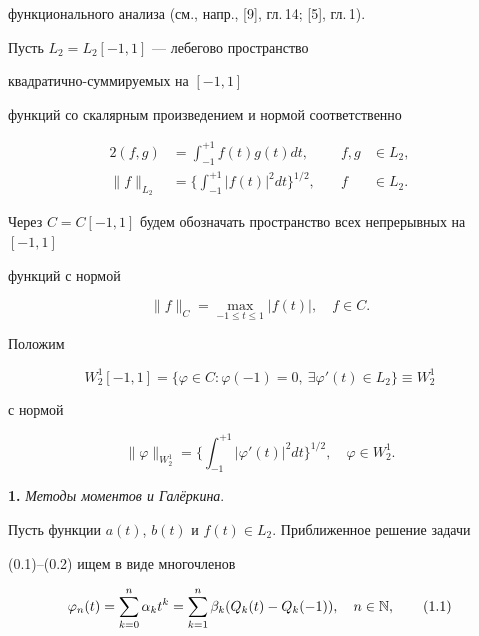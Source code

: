 функционального анализа (см., напр., [9], гл.\,14; [5], гл.\,1).





Пусть $L_2=L_2[-1,1]$ --- лебегово пространство 


квадратично-суммируемых на $[-1,1]$ 


функций со скалярным произведением и нормой соответственно


\begin{alignat*}{2}


(f,g)&=\int_{-1}^{+1}f(t)g(t)dt, &\quad f,g&\in L_2, \\


%


\|f\|_{L_2}&=\bigg\{\int_{-1}^{+1}{| f(t)|}^2dt\bigg\}^{1/2},


&\quad f&\in L_2.


\end{alignat*}


Через $C=C[-1,1]$ будем обозначать пространство всех непрерывных на $[-1,1]$


функций с нормой


$$


\| f\|_C=\max_{-1\leq t\leq 1}| f(t)|,\quad f\in C.


$$


Положим


$$


W^1_2[-1,1]=\lbrace\varphi\in C: \varphi(-1)=0,\ \exists\varphi'(t)


\in L_2\rbrace\equiv W^1_2


$$


с нормой 


$$


\|\varphi\|_{W^1_2}=\bigg\{\int_{-1}^{+1}{|\varphi'(t)|}^2dt


\bigg\}^{1/2},\quad \varphi\in W^1_2.


$$





{\bf 1.} {\it Методы моментов и Гал\"еркина}.


Пусть функции $a(t)$, $b(t)$ и $f(t)\in L_2$. Приближенное решение задачи


(0.1)--(0.2) ищем в виде многочленов


\begin{equation}


\varphi_n(t)=\sum_{k=0}^{n}\alpha_kt^k=\sum_{k=1}^{n}\beta_k(Q_k(t)-Q_k(-1)),


\quad n\in\N,


\tag{1.1}


\end{equation}


